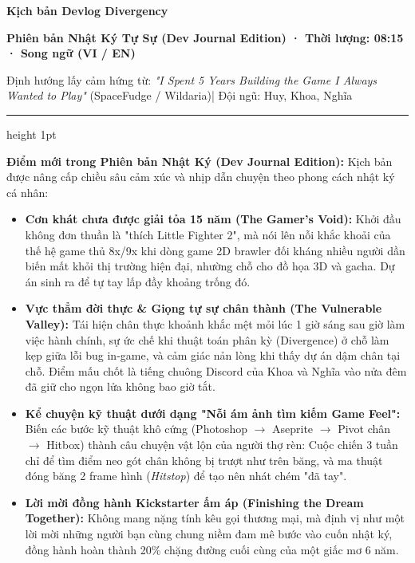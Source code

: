 \documentclass[11pt,a4paper]{article}
\begin{document}
{\LARGE\bfseries\color{divergencynavy} Kịch bản Devlog Divergency}\par
{\large\bfseries\color{divergencyaccent} Phiên bản Nhật Ký Tự Sự (Dev Journal Edition) · Thời lượng: 08:15 · Song ngữ (VI / EN)}\par
\vspace{0.2em}
{\small Định hướng lấy cảm hứng từ: \textit{"I Spent 5 Years Building the Game I Always Wanted to Play"} (SpaceFudge / Wildaria)\quad | \quad Đội ngũ: Huy, Khoa, Nghĩa}

\vspace{0.8em}
\hrule height 1pt
\vspace{0.8em}

\textbf{Điểm mới trong Phiên bản Nhật Ký (Dev Journal Edition):}
Kịch bản được nâng cấp chiều sâu cảm xúc và nhịp dẫn chuyện theo phong cách nhật ký cá nhân:
\begin{itemize}
    \item \textbf{Cơn khát chưa được giải tỏa 15 năm (The Gamer's Void):} Khởi đầu không đơn thuần là "thích Little Fighter 2", mà nói lên nỗi khắc khoải của thế hệ game thủ 8x/9x khi dòng game 2D brawler đối kháng nhiều người dần biến mất khỏi thị trường hiện đại, nhường chỗ cho đồ họa 3D và gacha. Dự án sinh ra để tự tay lấp đầy khoảng trống đó.
    \item \textbf{Vực thẳm đời thực \& Giọng tự sự chân thành (The Vulnerable Valley):} Tái hiện chân thực khoảnh khắc mệt mỏi lúc 1 giờ sáng sau giờ làm việc hành chính, sự ức chế khi thuật toán phân kỳ (Divergence) ở chỗ làm kẹp giữa lỗi bug in-game, và cảm giác nản lòng khi thấy dự án dậm chân tại chỗ. Điểm mấu chốt là tiếng chuông Discord của Khoa và Nghĩa vào nửa đêm đã giữ cho ngọn lửa không bao giờ tắt.
    \item \textbf{Kể chuyện kỹ thuật dưới dạng "Nỗi ám ảnh tìm kiếm Game Feel":} Biến các bước kỹ thuật khô cứng (Photoshop $\rightarrow$ Aseprite $\rightarrow$ Pivot chân $\rightarrow$ Hitbox) thành câu chuyện vật lộn của người thợ rèn: Cuộc chiến 3 tuần chỉ để tìm điểm neo gót chân không bị trượt như trên băng, và ma thuật đóng băng 2 frame hình (\textit{Hitstop}) để tạo nên nhát chém "đã tay".
    \item \textbf{Lời mời đồng hành Kickstarter ấm áp (Finishing the Dream Together):} Không mang nặng tính kêu gọi thương mại, mà định vị như một lời mời những người bạn cùng chung niềm đam mê bước vào cuốn nhật ký, đồng hành hoàn thành 20\% chặng đường cuối cùng của một giấc mơ 6 năm.
\end{itemize}
\end{document}
